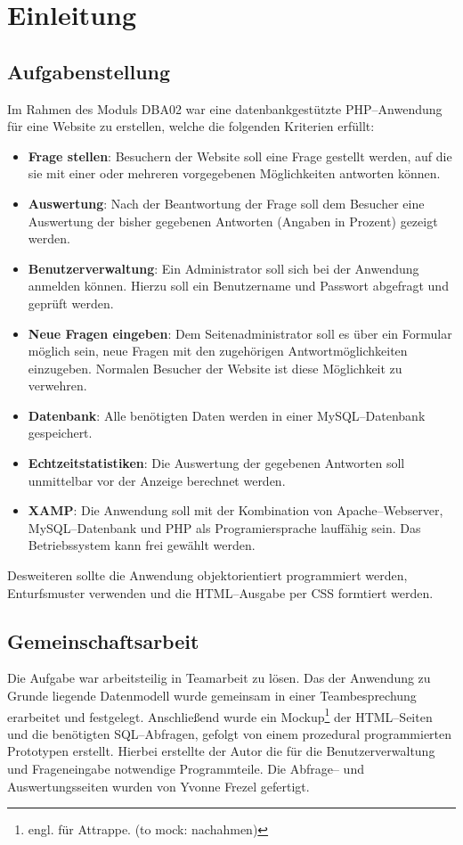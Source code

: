 \section{Einleitung}
\subsection{Aufgabenstellung}

Im Rahmen des Moduls DBA02 war eine datenbankgestützte PHP--Anwendung für eine Website zu erstellen, welche die folgenden Kriterien erfüllt:

\begin{itemize}
\item \textbf{Frage stellen}: Besuchern der Website soll eine Frage gestellt werden, auf die sie mit einer oder mehreren vorgegebenen Möglichkeiten antworten können.
\item \textbf{Auswertung}: Nach der Beantwortung der Frage soll dem Besucher eine Auswertung der bisher gegebenen Antworten (Angaben in Prozent) gezeigt werden.
\item \textbf{Benutzerverwaltung}: Ein Administrator soll sich bei der Anwendung anmelden können. Hierzu soll ein Benutzername und Passwort abgefragt und geprüft werden.
\item \textbf{Neue Fragen eingeben}: Dem Seitenadministrator soll es über ein Formular möglich sein, neue Fragen mit den zugehörigen Antwortmöglichkeiten einzugeben. Normalen Besucher der Website ist diese Möglichkeit zu verwehren.  
\item \textbf{Datenbank}: Alle benötigten Daten werden in einer MySQL--Datenbank gespeichert.
\item \textbf{Echtzeitstatistiken}: Die Auswertung der gegebenen Antworten soll unmittelbar vor der Anzeige berechnet werden.
\item \textbf{XAMP}: Die Anwendung soll mit der Kombination von Apache--Webserver, MySQL--Datenbank und PHP als Programiersprache lauffähig sein. Das Betriebssystem kann frei gewählt werden. 
\end{itemize}

Desweiteren sollte die Anwendung objektorientiert programmiert werden, Enturfsmuster verwenden und die HTML--Ausgabe per CSS formtiert werden.

\subsection{Gemeinschaftsarbeit}

Die Aufgabe war arbeitsteilig in Teamarbeit zu lösen. Das der Anwendung zu Grunde liegende Datenmodell wurde gemeinsam in einer Teambesprechung erarbeitet und festgelegt. Anschließend wurde ein Mockup\footnote{engl. für Attrappe. (to mock: nachahmen)} der HTML--Seiten und die benötigten SQL--Abfragen, gefolgt von einem prozedural programmierten Prototypen erstellt. Hierbei erstellte der Autor die für die Benutzerverwaltung und Frageneingabe notwendige Programmteile. Die Abfrage-- und Auswertungsseiten wurden von Yvonne Frezel gefertigt.

